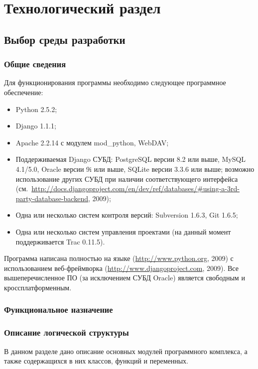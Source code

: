 \chapter{Технологический раздел}
\section{Выбор среды разработки}

\subsection{Общие сведения}
\label{sec:soft_description:general}

Для функционирования программы необходимо следующее программное обеспечение:
\begin{itemize}
\item Python 2.5.2;
\item Django 1.1.1;
\item Apache 2.2.14 с модулем mod\_python, WebDAV;
\item Поддерживаемая Django СУБД: PostgreSQL версии 8.2 или выше, MySQL 4.1/5.0, Oracle версии 9i или выше, SQLite версии 3.3.6 или выше; возможно использование других СУБД при наличии соответствующего интерфейса (см.~\url{http://docs.djangoproject.com/en/dev/ref/databases/#using-a-3rd-party-database-backend}, 2009);
\item Одна или несколько систем контроля версий: Subversion 1.6.3, Git 1.6.5;
\item Одна или несколько систем управления проектами (на данный момент поддерживается Trac 0.11.5).
\end{itemize}

Программа написана полностью на языке  (\url{http://www.python.org}, 2009) с использованием веб-фреймворка  (\url{http://www.djangoproject.com}, 2009). Все вышеперечисленное ПО (за исключением СУБД Oracle) является свободным и кроссплатформенным.

\subsection{Функциональное назначение}

\subsection{Описание логической структуры}

В данном разделе дано описание основных модулей программного комплекса, а также содержащихся в них классов, функций и переменных.


